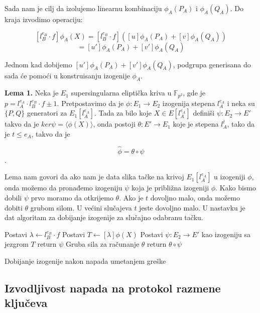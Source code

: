 \documentclass[a4paper]{article}
\begin{document}
\noindent Sada nam je cilj da izolujemo linearnu kombinaciju $ \phi_A(P_A)$ i  $ \phi_A(Q_A)$. Do kraja izvodimo operaciju:

$$[l^{e_B}_{B} \cdot f]\phi_A(X) = [l^{e_B}_{B} \cdot f] ([u]\phi_A(P_A) + [v]\phi_A(Q_A))$$
$$= [u']\phi_A(P_A) + [v']\phi_A(Q_A)$$

Jednom kad dobijemo $ [u']\phi_A(P_A) + [v']\phi_A(Q_A)$, podgrupa generisana do sada će pomoći u konstruisanju izogenije $\phi_A$.


\textbf{Lema 1.} Neka je $E_1$ supersingularna eliptička kriva u $\mathbb{F}_{p^2}$, gde je $p = l^{e_A}_{A} \cdot l^{e_B}_{B} \cdot f \pm 1$. Pretpostavimo da je $\phi : E_1 \longrightarrow E_2$ izogenija stepena $l_A^{e_A}$ i  neka su $\{P, Q\}$ generatori za $E_1[l_A^{e_A}]$. Tada za bilo koje $X \in E[l_A^{e_A}]$ definiši $\psi : E_2 \longrightarrow E'$ takvo da je $ker \psi = \langle \phi(X) \rangle$, onda postoji $\theta: E' \longrightarrow E_1$ koje je stepena $l_A^t$, tako da je $t \leq e_A$, takvo da je 

$$\widehat{\phi} = \theta \circ \psi$$.  

Lema nam govori da ako nam je data slika tačke na krivoj $E_1[l^{e_A}_A]$ u izogeniji $\phi$, onda možemo da pronađemo izogeniju $\psi$ koja je približna izogeniji $\phi$. Kako bismo dobili $\psi$ prvo moramo da otkrijemo $\theta$. Ako je $t$ dovoljno malo, onda možemo dobiti $\theta$ grubom silom. U većini slučajeva $t$ jeste dovoljno malo. U nastavku je dat algoritam za dobijanje izogenije za slučajno odabranu tačku.


\begin{algorithm}
	\label{alg: napad greskom}
	
	\Output{$\widehat{\phi}$}

	Postavi $\lambda \longleftarrow l_B^{e_B} \cdot f$ \;
	Postavi $T \longleftarrow [\lambda]\phi(X)$ \;
	Postavi $\psi: E_2 \longrightarrow E'$ kao izogeniju sa jezgrom $T$\;
		{
			return $\psi$
		}
		{
			Gruba sila za računanje $\theta$
		}
	return $\theta \circ \psi$
	\caption{Dobijanje izogenije nakon napada umetanjem greške}
\end{algorithm}


\subsection{Izvodljivost napada na protokol razmene ključeva}
\end{document}
